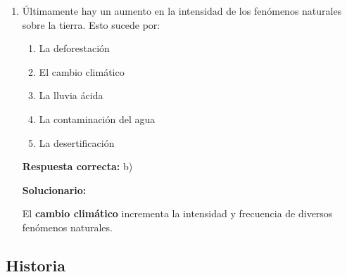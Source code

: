 \begin{enumerate}[resume]
	\vspace{2mm}
	\textbf{Solucionario:}
	
	El eje polar o axial también recibe el nombre de \textbf{eje terrestre}.
	
	\vspace{6mm}
	
	\item Últimamente hay un aumento en la intensidad de los fenómenos naturales sobre la tierra. Esto sucede por:
	\begin{enumerate}[label=\alph*)]
		\item La deforestación
		\item El cambio climático
		\item La lluvia ácida
		\item La contaminación del agua
		\item La desertificación
	\end{enumerate}
	\textbf{Respuesta correcta:} b)
	
	\vspace{2mm}
	\textbf{Solucionario:}
	
	El \textbf{cambio climático} incrementa la intensidad y frecuencia de diversos fenómenos naturales.
	
	\vspace{6mm}
	
\end{enumerate}

\subsection*{Historia}

